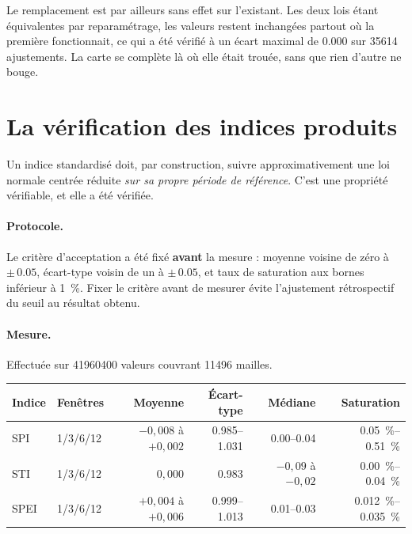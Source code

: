 Le remplacement est par ailleurs sans effet sur l'existant. Les deux lois étant équivalentes par
reparamétrage, les valeurs restent inchangées partout où la première fonctionnait, ce qui a été
vérifié à un écart maximal de \num{0,000} sur \num{35614} ajustements. La carte se complète là où elle était trouée, sans que rien d'autre ne bouge.

\section{La vérification des indices produits}

Un indice standardisé doit, par construction, suivre approximativement une loi normale centrée
réduite \emph{sur sa propre période de référence}. C'est une propriété vérifiable, et elle a été
vérifiée.

\paragraph{Protocole.} Le critère d'acceptation a été fixé \textbf{avant} la mesure : moyenne
voisine de zéro à $\pm\,\num{0,05}$, écart-type voisin de un à $\pm\,\num{0,05}$, et taux de
saturation aux bornes inférieur à \SI{1}{\percent}. Fixer le critère avant de mesurer évite
l'ajustement rétrospectif du seuil au résultat obtenu.

\paragraph{Mesure.} Effectuée sur \num{41960400} valeurs couvrant \num{11496} mailles.

\begin{center}
\begin{tabularx}{\textwidth}{@{}lXrrrr@{}}
\toprule
\textbf{Indice} & \textbf{Fenêtres} & \textbf{Moyenne} & \textbf{Écart-type} & \textbf{Médiane}
& \textbf{Saturation} \\
\midrule
SPI  & 1/3/6/12 & $-0{,}008$ à $+0{,}002$ & \numrange{0,985}{1,031} & \numrange{0,00}{0,04} & \SIrange{0,05}{0,51}{\percent} \\
STI  & 1/3/6/12 & $0{,}000$               & \num{0,983}            & $-0{,}09$ à $-0{,}02$ & \SIrange{0,00}{0,04}{\percent} \\
SPEI & 1/3/6/12 & $+0{,}004$ à $+0{,}006$ & \numrange{0,999}{1,013} & \numrange{0,01}{0,03} & \SIrange{0,012}{0,035}{\percent} \\
\bottomrule
\end{tabularx}
\end{center}

